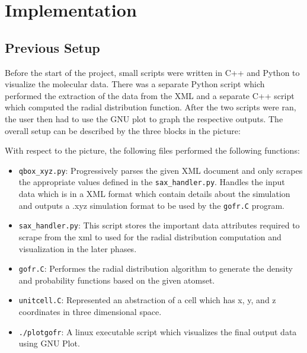 \section*{Implementation}

\subsection*{Previous Setup}

Before the start of the project, small scripts were written in C++ and Python to visualize the molecular data. There was a separate Python script which performed the extraction of the data from the XML and a separate C++ script which computed the radial distribution function. After the two scripts were ran, the user then had to use the GNU plot to graph the respective outputs. The overall setup can be described by the three blocks in the picture:





With respect to the picture, the following files performed the following functions: 

\begin{itemize}
        
    \item \verb|qbox_xyz.py|: Progressively parses the given XML document and only scrapes the appropriate values defined in the \verb|sax_handler.py|. Handles the input data which is in a XML format which contain details about the simulation and outputs a .xyz simulation format to be used by the \verb|gofr.C| program.
    
    \item \verb|sax_handler.py|: This script stores the important data attributes required to scrape from the xml to used for the radial distribution computation and visualization in the later phases.

    \item \verb|gofr.C|: Performes the radial distribution algorithm to generate the density and probability functions based on the given atomset.
    
    \item \verb|unitcell.C|: Represented an abstraction of a cell which has x, y, and z coordinates in three dimensional space.
    
    \item \verb|./plotgofr|: A linux executable script which visualizes the final output data using GNU Plot.
    
\end{itemize}





